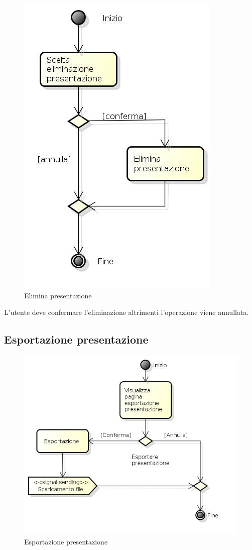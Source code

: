 \begin{figure}[h!]
		\centering
		\includegraphics[scale=.2]{img/Elimina_presentazione.jpg}
		\caption{Elimina presentazione}
		\label{fig:ModelloSpy}
\end{figure}  

L'utente deve confermare l'eliminazione altrimenti l'operazione viene annullata.

\subsection{Esportazione presentazione}

\begin{figure}[h!]
		\centering
		\includegraphics[scale=.2]{img/Esporta_presentazione.jpg}
		\caption{Esportazione presentazione}
		\label{fig:ModelloSpy}
\end{figure}

